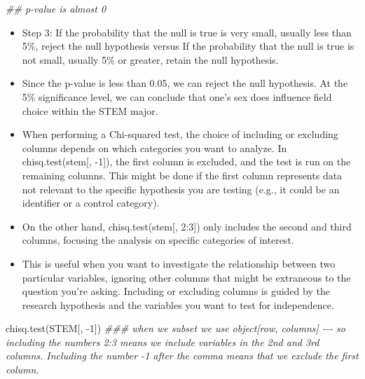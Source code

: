 \documentclass[
  letterpaper,
  DIV=11,
  numbers=noendperiod]{scrreprt}
\newenvironment{Shaded}{\begin{snugshade}}{\end{snugshade}}
\newcommand{\DecValTok}[1]{\textcolor[rgb]{0.68,0.00,0.00}{#1}}
\newcommand{\DocumentationTok}[1]{\textcolor[rgb]{0.37,0.37,0.37}{\textit{#1}}}
\newcommand{\FunctionTok}[1]{\textcolor[rgb]{0.28,0.35,0.67}{#1}}
\newcommand{\NormalTok}[1]{\textcolor[rgb]{0.00,0.23,0.31}{#1}}
\newcommand{\SpecialCharTok}[1]{\textcolor[rgb]{0.37,0.37,0.37}{#1}}
\begin{document}
\begin{Shaded}
\begin{Highlighting}[]
\DocumentationTok{\#\# p{-}value is almost 0}
\end{Highlighting}
\end{Shaded}

\begin{itemize}
\item
  Step 3: If the probability that the null is true is very small,
  usually less than 5\%, reject the null hypothesis versus If the
  probability that the null is true is not small, usually 5\% or
  greater, retain the null hypothesis.
\item
  Since the p-value is less than 0.05, we can reject the null
  hypothesis. At the 5\% significance level, we can conclude that one's
  sex does influence field choice within the STEM major.
\item
  When performing a Chi-squared test, the choice of including or
  excluding columns depends on which categories you want to analyze. In
  chisq.test(stem{[}, -1{]}), the first column is excluded, and the test
  is run on the remaining columns. This might be done if the first
  column represents data not relevant to the specific hypothesis you are
  testing (e.g., it could be an identifier or a control category).
\item
  On the other hand, chisq.test(stem{[}, 2:3{]}) only includes the
  second and third columns, focusing the analysis on specific categories
  of interest.
\item
  This is useful when you want to investigate the relationship between
  two particular variables, ignoring other columns that might be
  extraneous to the question you're asking. Including or excluding
  columns is guided by the research hypothesis and the variables you
  want to test for independence.
\end{itemize}

\begin{Shaded}
\begin{Highlighting}[]
\FunctionTok{chisq.test}\NormalTok{(STEM[, }\SpecialCharTok{{-}}\DecValTok{1}\NormalTok{])  }\DocumentationTok{\#\#\# when we subset we use object[row, columns] {-}{-}{-} so including the numbers 2:3 means we include variables in the 2nd and 3rd columns. Including the number {-}1 after the comma means that we exclude the first column. }
\end{Highlighting}
\end{Shaded}
\end{document}
